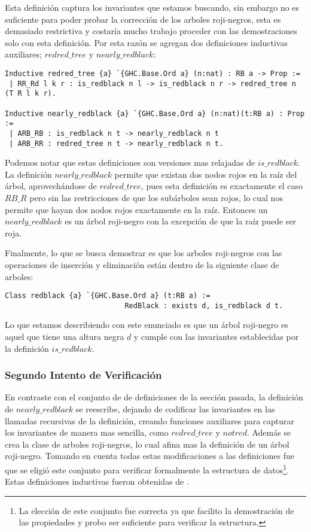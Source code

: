 \documentclass[letterpaper,12pt,oneside]{book}
\newcommand{\arn}{árbol roji-negro}
\newcommand{\arns}{arboles roji-negros}
\theoremstyle{plain}
\theoremstyle{definition}
\theoremstyle{remark}
\begin{document}
Esta definici\'on captura los invariantes que estamos buscando, sin embargo no es suficiente para poder 
probar la correcci\'on de los {\arns}, esta es demasiado restrictiva y costaría mucho trabajo proceder con las
demostraciones solo con esta definici\'on. Por esta razón se agregan dos definiciones inductivas auxiliares; 
$redred\_tree$ y $nearly\_redblack$: 

\begin{verbatim}
Inductive redred_tree {a} `{GHC.Base.Ord a} (n:nat) : RB a -> Prop :=
 | RR_Rd l k r : is_redblack n l -> is_redblack n r -> redred_tree n (T R l k r).

Inductive nearly_redblack {a} `{GHC.Base.Ord a} (n:nat)(t:RB a) : Prop :=
 | ARB_RB : is_redblack n t -> nearly_redblack n t
 | ARB_RR : redred_tree n t -> nearly_redblack n t.
\end{verbatim}

Podemos notar que estas definiciones son versiones mas relajadas de $is\_redblack$. La definici\'on 
$nearly\_redblack$ permite que existan dos nodos rojos en la ra\'iz del \'arbol, aprovech\'andose de
$redred\_tree$, pues esta definici\'on es exactamente el caso $RB\_R$ pero sin las restricciones de que 
los sub\'arboles sean rojos, lo cual nos permite que hayan dos nodos rojos exactamente en la ra\'iz. 
Entonces un $nearly\_redblack$ es un {\arn} con la excepci\'on de que la ra\'iz puede ser roja. 

Finalmente, lo que se busca demostrar es que los {\arns} con las operaciones de inserci\'on y 
eliminaci\'on están dentro de la siguiente clase de arboles:

\begin{verbatim}
Class redblack {a} `{GHC.Base.Ord a} (t:RB a) := 
                            RedBlack : exists d, is_redblack d t.
\end{verbatim}

Lo que estamos describiendo con este enunciado es que un {\arn} es aquel que tiene una altura negra $d$ y
cumple con las invariantes establecidas por la definici\'on $is\_redblack$.

\subsubsection{Segundo Intento de Verificaci\'on}
En contraste con el conjunto de de definiciones de la secci\'on pasada, la definici\'on de 
$nearly\_redblack$ se reescribe, dejando de codificar las invariantes en las llamadas recursivas de la 
definición, creando funciones auxiliares para capturar los invariantes de manera mas sencilla, como 
$redred\_tree$ y $notred$. Además se crea la clase de {\arns}, lo cual afina mas la definici\'on de un 
{\arn}. Tomando en cuenta todas estas modificaciones a las definiciones fue que se eligió este conjunto 
para verificar formalmente la estructura de datos\footnote{La elecci\'on de este conjunto fue correcta ya
que facilito la demostraci\'on de las propiedades y probo ser suficiente para verificar la estructura.}. 
Estas definiciones inductivas fueron obtenidas de \cite{MSetRBT}.
\end{document}
